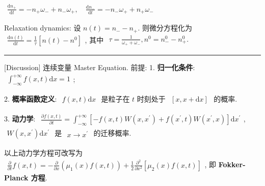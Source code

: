 \documentclass[../../main.tex]{subfiles}
\begin{document}
$\begin{aligned}
    \frac{\mathrm{d}n_{+}}{\mathrm{d}t} = -n_{+}\omega_{-} + n_{-}\omega_{+},\quad \frac{\mathrm{d}n_{-}}{\mathrm{d}t} = -n_{-}\omega_{+} + n_{+}\omega_{-}
\end{aligned}$

Relaxation dynamics: 设 $n(t) = n_{-}-n_{+}$. 则微分方程化为 $\begin{aligned}
    \frac{\mathrm{d}n(t)}{\mathrm{d}t} 
    = \frac{1}{\tau}\left[n(t)-n^{0}\right]
\end{aligned}$, 其中 $\begin{aligned}
    \tau = \frac{1}{\omega_{+}+\omega_{-}}, n^{0} = n_{-}^{0}-n_{+}^{0}.
\end{aligned}$

\vspace{0.5em}\hrule\vspace{0.5em}

[Discussion] 连续变量 Master Equation. 前提: 
1. \textbf{归一化条件}: $\begin{aligned}
    \int_{-\infty}^{+\infty}f(x,t)\mathrm{d}x = 1
\end{aligned}$; 

2. \textbf{概率函数定义}: $\begin{aligned}
    f(x,t)\mathrm{d}x
\end{aligned}$ 是粒子在 $t$ 时刻处于 $\begin{aligned}
    [x,x+\mathrm{d}x]
\end{aligned}$ 的概率.

3. \textbf{动力学}: $\begin{aligned}
    \frac{\partial f(x,t)}{\partial t} = \int_{-\infty}^{+\infty}\left[
        -f(x,t)W\left(x,x^{\prime}\right) + f\left(x^{\prime},t\right)W\left(x^{\prime},x\right)
    \right]\mathrm{d}x^{\prime}
\end{aligned}$, $\begin{aligned}
    W(x,x^{\prime})\mathrm{d}x^{\prime}
\end{aligned}$ 是 $\begin{aligned}
    x\rightarrow x^{\prime}
\end{aligned}$ 的迁移概率.

以上动力学方程可改写为 $\begin{aligned}
    \frac{\partial}{\partial t}f(x,t) = -\frac{\partial}{\partial x}\left(\mu_{1}(x)f(x,t)\right) + \frac{1}{2}\frac{\partial^{2}}{\partial x^{2}}\left[\mu_{2}(x)f(x,t)\right]
\end{aligned}$, 即 \textbf{Fokker-Planck 方程}.
\end{document}
